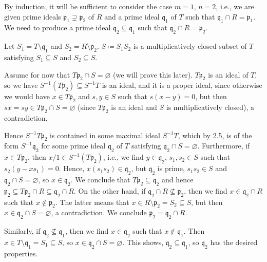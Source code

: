By induction, it will be sufficient to consider the case $m = 1$, $n = 2$, i.e.,
we are given prime ideals $\mathfrak{p}_1 \supsetneq \mathfrak{p}_2$ of $R$ and
a prime ideal $\mathfrak{q}_1$ of $T$ such that $\mathfrak{q}_1\cap R = \mathfrak{p}_1$.
We need to produce a prime ideal $\mathfrak{q}_2 \subseteq \mathfrak{q}_1$ such that
$\mathfrak{q}_2\cap R = \mathfrak{p}_2$.

Let $S_1 = T\setminus \mathfrak{q}_1$ and $S_2 = R\setminus \mathfrak{p}_2$.
$S\coloneqq S_1S_2$ is a multiplicatively closed subset of $T$ satisfying
$S_1 \subseteq S$ and $S_2 \subseteq S$.

Assume for now that $T \mathfrak{p}_2\cap S = \varnothing$ (we will prove this later).
$T \mathfrak{p}_2$ is an ideal of $T$, so we have $S^{-1}(T \mathfrak{p}_2) \subseteq S^{-1} T$
is an ideal, and it is a proper ideal, since otherwise we would have
$x \in T \mathfrak{p}_2$ and $s, y \in S$ such that $s(x-y) = 0$, but then
$sx = sy \in T \mathfrak{p}_2 \cap S = \varnothing$ (since $T \mathfrak{p}_2$ is
an ideal and $S$ is multiplicatively closed), a contradiction.

Hence $S^{-1} T \mathfrak{p}_2$ is contained in some maximal ideal $S^{-1}T$, which
by 2.5, is of the form $S^{-1} \mathfrak{q}_2$ for some prime ideal $\mathfrak{q}_2$
of $T$ satisfying $\mathfrak{q}_2\cap S = \varnothing$. Furthermore, if
$x \in T \mathfrak{p}_2$, then $x/1 \in S^{-1}(T \mathfrak{p}_2)$, i.e., we find
$y \in \mathfrak{q}_2$, $s_1, s_2 \in S$ such that $s_2(y - xs_1) = 0$. Hence,
$x(s_1s_2) \in \mathfrak{q}_2$, but $\mathfrak{q}_2$ is prime, $s_1s_2 \in S$ and
$\mathfrak{q}_2\cap S = \varnothing$, so $x \in \mathfrak{q}_2$. We conclude that
$T \mathfrak{p}_2 \subseteq \mathfrak{q}_2$ and hence
$\mathfrak{p}_2 \subseteq T \mathfrak{p}_2 \cap R \subseteq \mathfrak{q}_2 \cap R$.
On the other hand, if $\mathfrak{q}_2 \cap R \nsubseteq \mathfrak{p}_2$, then
we find $x \in \mathfrak{q}_2\cap R$ such that $x\notin \mathfrak{p}_2$. The
latter means that $x \in R\setminus \mathfrak{p}_2 = S_2 \subseteq S$, but then
$x \in \mathfrak{q}_2 \cap S = \varnothing$, a contradiction. We conclude
$\mathfrak{p}_2 = \mathfrak{q}_2\cap R$.

Similarly, if $\mathfrak{q_2} \nsubseteq \mathfrak{q}_1$, then we find
$x \in \mathfrak{q}_2$ such that $x\notin \mathfrak{q}_1$. Then
$x \in T\setminus \mathfrak{q}_1 = S_1 \subseteq S$, so $x \in \mathfrak{q}_2 \cap S = \varnothing$.
This shows, $\mathfrak{q}_2 \subseteq \mathfrak{q}_1$, so $\mathfrak{q}_2$ has
the desired properties.

